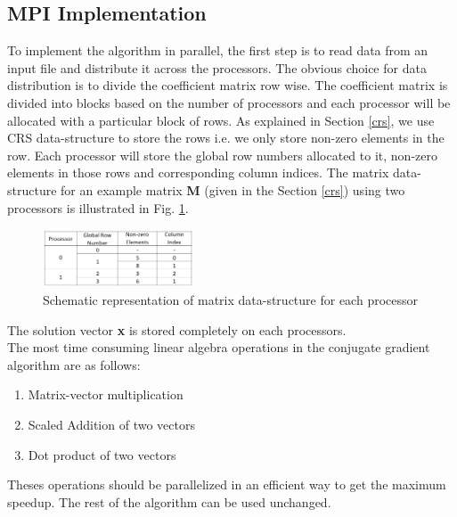 \documentclass[sigplan,screen]{acmart}
\begin{document}
\subsection{MPI Implementation}
To implement the algorithm in parallel, the first step is to read data from an input file and distribute it across the processors. The obvious choice for data distribution is to divide the  coefficient matrix row wise. The coefficient matrix is divided into blocks based on the number of processors and each processor will be allocated with a particular block of rows. As explained in Section \ref{crs}, we use CRS data-structure to store the rows i.e. we only store non-zero elements in the row. Each processor will store the global row numbers allocated to it, non-zero elements in those rows and corresponding column indices. The matrix data-structure for an example matrix \textbf{M} (given in the Section \ref{crs}) using two processors is illustrated in Fig. \ref{fig1}.
\begin{figure}[h!]
	\begin{center}
		\includegraphics[width=0.4\textwidth]{plots/data.JPG}
	\end{center}
	\caption{Schematic representation of matrix data-structure for each processor}
	\label{fig1} 
\end{figure}
The solution vector \textbf{x} is stored completely on each processors.\\
The most time consuming linear algebra operations in the conjugate gradient algorithm are as follows:
\begin{enumerate}
	\item Matrix-vector multiplication
	\item Scaled Addition of two vectors
	\item Dot product of two vectors	
\end{enumerate}
Theses operations should be parallelized in an efficient way to get the maximum speedup.  The rest of the algorithm can be used unchanged.  
\end{document}

